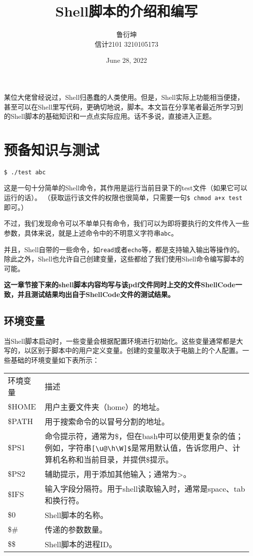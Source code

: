 \documentclass[UTF8]{article}
\title{Shell脚本的介绍和编写}
\author{鲁衍坤 \\ 信计2101 3210105173}
\date{June 28, 2022}
\begin{document}
\maketitle

某位大佬曾经说过，Shell归愚蠢的人类使用。但是，Shell实际上功能相当便捷，甚至可以在Shell里写代码，更确切地说，脚本。本文旨在分享笔者最近所学习到的Shell脚本的基础知识和一点点实际应用。话不多说，直接进入正题。

\section{预备知识与测试}

\begin{verbatim}
$ ./test abc
\end{verbatim}

这是一句十分简单的Shell命令，其作用是运行当前目录下的test文件（如果它可以运行的话）。
（获取运行该文件的权限也很简单，只需要一句\verb|$ chmod a+x test|即可。）

不过，我们发现命令可以不单单只有命令，我们可以为即将要执行的文件传入一些参数，具体来说，就是上述命令中的不明意义字符串\verb|abc|。

并且，Shell自带的一些命令，如\verb|read|或者\verb|echo|等，都是支持输入输出等操作的。除此之外，Shell也允许自己创建变量，这些都给了我们使用Shell命令编写脚本的可能。

\textbf{这一章节接下来的shell脚本内容均写与该pdf文件同时上交的文件ShellCode一致，并且测试结果均出自于ShellCode文件的测试结果。}

\subsection{环境变量}

当Shell脚本启动时，一些变量会根据配置环境进行初始化。这些变量通常都是大写的，以区别于脚本中的用户定义变量。创建的变量取决于电脑上的个人配置。一些基础的环境变量如下表所示：

\begin{tabular}{|l|p{18em}|}
  \hline
  环境变量 & 描述\\
  \cline{1-2}
  \$HOME & 用户主要文件夹（home）的地址。\\
  \$PATH & 用于搜索命令的以冒号分割的地址。\\
  \$PS1 & 命令提示符，通常为\$，但在bash中可以使用更复杂的值；例如，字符串\verb|[\u@\h\W]$|是常用默认值，告诉您用户、计算机名称和当前目录，并提供\$提示。\\
  \$PS2 & 辅助提示，用于添加其他输入；通常为>。\\
  \$IFS & 输入字段分隔符。用于shell读取输入时，通常是space、tab和换行符。\\
  \$0 & Shell脚本的名称。\\
  \$\# & 传递的参数数量。\\
  \$\$ & Shell脚本的进程ID。\\
  \hline
\end{tabular}
\end{document}
